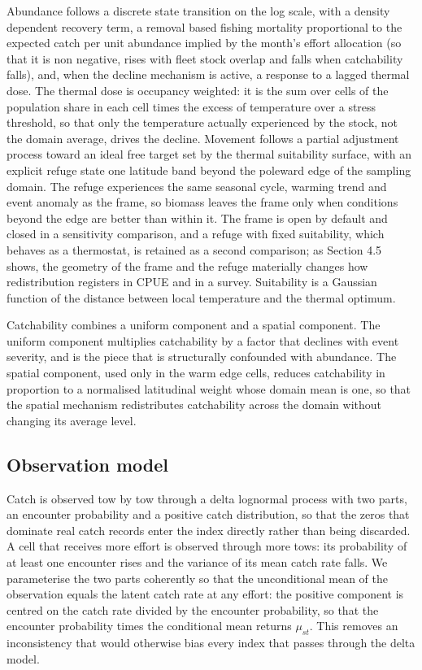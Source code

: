 \documentclass[
  11pt,
  a4paper,
]{article}
\begin{document}
Abundance follows a discrete state transition on the log scale, with a
density dependent recovery term, a removal based fishing mortality
proportional to the expected catch per unit abundance implied by the
month's effort allocation (so that it is non negative, rises with fleet
stock overlap and falls when catchability falls), and, when the decline
mechanism is active, a response to a lagged thermal dose. The thermal
dose is occupancy weighted: it is the sum over cells of the population
share in each cell times the excess of temperature over a stress
threshold, so that only the temperature actually experienced by the
stock, not the domain average, drives the decline. Movement follows a
partial adjustment process toward an ideal free target set by the
thermal suitability surface, with an explicit refuge state one latitude
band beyond the poleward edge of the sampling domain. The refuge
experiences the same seasonal cycle, warming trend and event anomaly as
the frame, so biomass leaves the frame only when conditions beyond the
edge are better than within it. The frame is open by default and closed
in a sensitivity comparison, and a refuge with fixed suitability, which
behaves as a thermostat, is retained as a second comparison; as Section
4.5 shows, the geometry of the frame and the refuge materially changes
how redistribution registers in CPUE and in a survey. Suitability is a
Gaussian function of the distance between local temperature and the
thermal optimum.

Catchability combines a uniform component and a spatial component. The
uniform component multiplies catchability by a factor that declines with
event severity, and is the piece that is structurally confounded with
abundance. The spatial component, used only in the warm edge cells,
reduces catchability in proportion to a normalised latitudinal weight
whose domain mean is one, so that the spatial mechanism redistributes
catchability across the domain without changing its average level.

\hypertarget{observation-model-1}{%
\subsection{Observation model}\label{observation-model-1}}

Catch is observed tow by tow through a delta lognormal process with two
parts, an encounter probability and a positive catch distribution, so
that the zeros that dominate real catch records enter the index directly
rather than being discarded. A cell that receives more effort is
observed through more tows: its probability of at least one encounter
rises and the variance of its mean catch rate falls. We parameterise the
two parts coherently so that the unconditional mean of the observation
equals the latent catch rate at any effort: the positive component is
centred on the catch rate divided by the encounter probability, so that
the encounter probability times the conditional mean returns
\(\mu_{st}\). This removes an inconsistency that would otherwise bias
every index that passes through the delta model.
\end{document}
